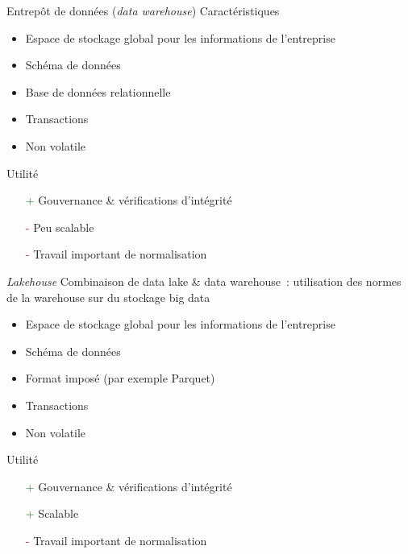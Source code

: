 \begin{frame}{Entrepôt de données (\textit{data warehouse})}
  Caractéristiques

  \begin{itemize}
    \item Espace de stockage global pour les informations de l'entreprise
    \item Schéma de données
    \item Base de données relationnelle
    \item Transactions
    \item Non volatile
  \end{itemize}

  Utilité

  \begin{itemize}
    \item[\textcolor{green}{+}] Gouvernance \& vérifications d'intégrité
    \item[\textcolor{red}{-}] Peu scalable
    \item[\textcolor{red}{-}] Travail important de normalisation
  \end{itemize}
\end{frame}

\begin{frame}{\textit{Lakehouse}}
  Combinaison de data lake \& data warehouse~: utilisation des normes de la warehouse sur du stockage big data
  \begin{itemize}
    \item Espace de stockage global pour les informations de l'entreprise
    \item Schéma de données
    \item Format imposé (par exemple Parquet)
    \item Transactions
    \item Non volatile
  \end{itemize}

  Utilité

  \begin{itemize}
    \item[\textcolor{green}{+}] Gouvernance \& vérifications d'intégrité
    \item[\textcolor{green}{+}] Scalable
    \item[\textcolor{red}{-}] Travail important de normalisation
  \end{itemize}
\end{frame}

